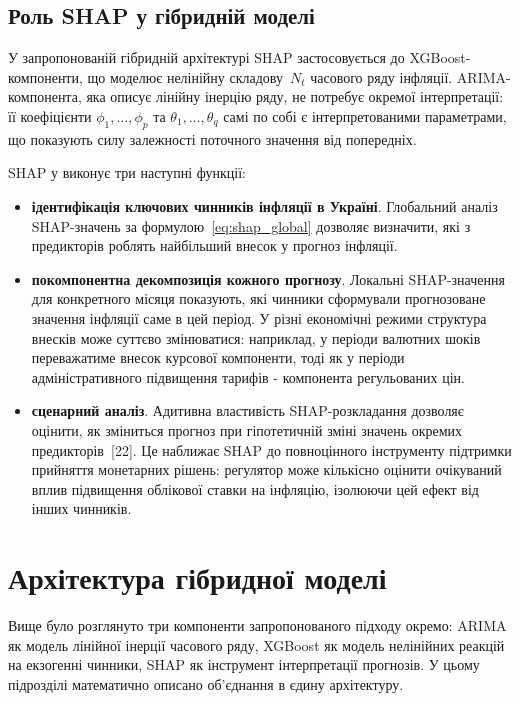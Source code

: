 \documentclass{bachelor_thesis}
\begin{document}
\subsection{Роль SHAP у гібридній моделі}

У запропонованій гібридній архітектурі SHAP застосовується до XGBoost-компоненти, що моделює нелінійну складову~$N_t$ часового ряду інфляції. ARIMA-компонента, яка описує лінійну інерцію ряду, не потребує окремої інтерпретації: її коефіцієнти $\phi_1, \ldots, \phi_p$ та $\theta_1, \ldots, \theta_q$ самі по собі є інтерпретованими параметрами, що показують силу залежності поточного значення від попередніх.

SHAP у виконує три наступні функції:

\begin{itemize}
    \item \textbf{ідентифікація ключових чинників інфляції в Україні}. Глобальний аналіз SHAP-значень за формулою~\eqref{eq:shap_global} дозволяє визначити, які з предикторів роблять найбільший внесок у прогноз інфляції.
    \item \textbf{покомпонентна декомпозиція кожного прогнозу}. Локальні SHAP-значення для конкретного місяця показують, які чинники сформували прогнозоване значення інфляції саме в цей період. У різні економічні режими структура внесків може суттєво змінюватися: наприклад, у періоди валютних шоків переважатиме внесок курсової компоненти, тоді як у періоди адміністративного підвищення тарифів - компонента регульованих цін.
    \item \textbf{сценарний аналіз}. Адитивна властивість SHAP-розкладання дозволяє оцінити, як зміниться прогноз при гіпотетичній зміні значень окремих предикторів~[22]. Це наближає SHAP до повноцінного інструменту підтримки прийняття монетарних рішень: регулятор може кількісно оцінити очікуваний вплив підвищення облікової ставки на інфляцію, ізолюючи цей ефект від інших чинників.
\end{itemize}

\section{Архітектура гібридної моделі}

Вище було розглянуто три компоненти запропонованого підходу окремо: ARIMA як модель лінійної інерції часового ряду, XGBoost як модель нелінійних реакцій на екзогенні чинники, SHAP як інструмент інтерпретації прогнозів. У цьому підрозділі математично описано об'єднання в єдину архітектуру.
\end{document}
